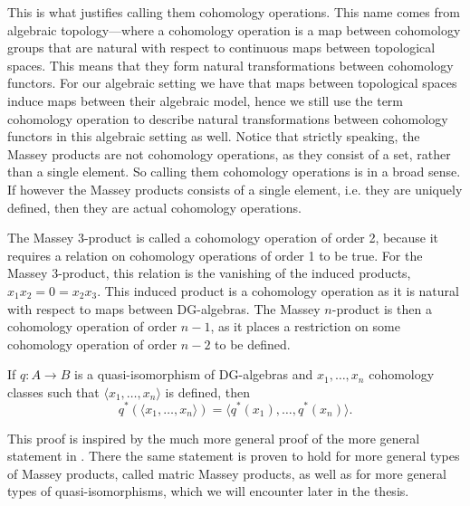 This is what justifies calling them cohomology operations. This name comes  from algebraic topology---where a cohomology operation is a map between cohomology groups that are natural with respect to continuous maps between topological spaces. This means that they form natural transformations between cohomology functors. For our algebraic setting we have that maps between topological spaces induce maps between their algebraic model, hence we still use the term cohomology operation to describe natural transformations between cohomology functors in this algebraic setting as well. Notice that strictly speaking, the Massey products are not cohomology operations, as they consist of a set, rather than a single element. So calling them cohomology operations is in a broad sense. If however the Massey products consists of a single element, i.e. they are uniquely defined, then they are actual cohomology operations. 

The Massey 3-product is called a cohomology operation of order 2, because it requires a relation on cohomology operations of order 1 to be true. For the Massey 3-product, this relation is the vanishing of the induced products, $x_1 x_2 = 0 = x_2 x_3$. This induced product is a cohomology operation as it is natural with respect to maps between DG-algebras. The Massey $n$-product is then a cohomology operation of order $n-1$, as it places a restriction on some cohomology operation of order $n-2$ to be defined.   


\begin{theorem}
If $q\colon A\longrightarrow B$ is a quasi-isomorphism of DG-algebras and $x_1, \ldots, x_n$ cohomology classes such that $\langle x_1, \ldots, x_n\rangle$ is defined, then 
\begin{equation*}
    q^*(\langle x_1, \ldots, x_n\rangle) = \langle q^*(x_1),\ldots, q^*(x_n)\rangle .
\end{equation*}
\end{theorem}

This proof is inspired by the much more general proof of the more general statement in \cite[Theorem 1.5]{naturality}. There the same statement is proven to hold for more general types of Massey products, called matric Massey products, as well as for more general types of quasi-isomorphisms, which we will encounter later in the thesis. 

